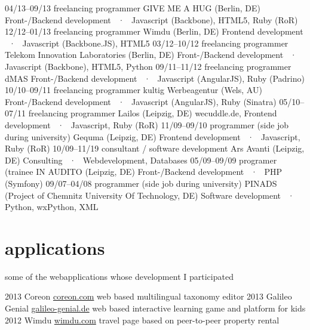 \documentclass[]{friggeri-cv}
\begin{document}
\begin{entrylist}
  \entry
    {04/13–09/13}
    {freelancing programmer}
    {GIVE ME A HUG (Berlin, DE)}
    {Front-/Backend development ~·~ Javascript (Backbone), HTML5, Ruby (RoR)}
  \entry
    {12/12–01/13}
    {freelancing programmer}
    {Wimdu (Berlin, DE)}
    {Frontend development ~·~ Javascript (Backbone.JS), HTML5}
  \entry
    {03/12–10/12}
    {freelancing programmer}
    {Telekom Innovation Laboratories (Berlin, DE)}
    {Front-/Backend development ~·~ Javascript (Backbone), HTML5, Python}
  \entry
    {09/11–11/12}
    {freelancing programmer}
    {dMAS}
    {Front-/Backend development ~·~ Javascript (AngularJS), Ruby (Padrino)}
  \entry
    {10/10–09/11}
    {freelancing programmer}
    {kultig Werbeagentur (Wels, AU)}
    {Front-/Backend development ~·~ Javascript (AngularJS), Ruby (Sinatra)}
  \entry
    {05/10–07/11}
    {freelancing programmer}
    {Lailos (Leipzig, DE)}
    {wecuddle.de, Frontend development ~·~ Javascript, Ruby (RoR)}
  \entry
    {11/09–09/10}
    {programmer (side job during university)}
    {Gequma (Leipzig, DE)}
    {Frontend development ~·~ Javascript, Ruby (RoR)}
  \entry
    {10/09–11/19}
    {consultant / software development}
    {Ars Avanti (Leipzig, DE)}
    {Consulting ~·~ Webdevelopment, Databases}
  \entry
    {05/09–09/09}
    {programer (trainee}
    {IN AUDITO (Leipzig, DE)}
    {Front-/Backend development ~·~ PHP (Symfony)}
  \entry
    {09/07–04/08}
    {programmer (side job during university)}
    {PINADS (Project of Chemnitz University Of Technology, DE)}
    {Software development ~·~ Python, wxPython, XML}
\end{entrylist}


\section{applications}
some of the webapplications whose development I participated

\begin{entrylist}
  \entry
    {2013}
    {Coreon}
    {\href{http://coreon.com}{coreon.com}}
    {web based multilingual taxonomy editor}
  \entry
    {2013}
    {Galileo Genial}
    {\href{http://news.galileo-genial.de}{galileo-genial.de}}
    {web based interactive learning game and platform for kids}
  \entry
    {2012}
    {Wimdu}
    {\href{http://wimdu.com}{wimdu.com}}
    {travel page based on peer-to-peer property rental}
\end{entrylist}
\end{document}
